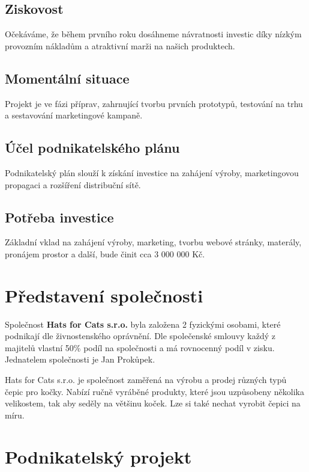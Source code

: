 \documentclass[12pt, a4paper]{article}
\begin{document}
\subsection{Ziskovost}
Očekáváme, že během prvního roku dosáhneme návratnosti investic díky 
nízkým provozním nákladům 
a atraktivní marži na našich produktech.

\subsection{Momentální situace}
Projekt je ve fázi příprav, zahrnující tvorbu prvních prototypů, 
testování na trhu a sestavování marketingové kampaně.

\subsection{Účel podnikatelského plánu}
Podnikatelský plán slouží k získání investice na zahájení výroby, 
marketingovou propagaci a rozšíření distribuční sítě.

\subsection{Potřeba investice}
Základní vklad na zahájení výroby, marketing, tvorbu webové stránky, materály,
pronájem prostor a další, bude činit cca 3 000 000 Kč.

\section{Představení společnosti}
Společnost \textbf{Hats for Cats s.r.o.} byla založena 2 fyzickými osobami,
které podnikají dle živnostenského oprávnění. Dle společenské smlouvy
každý z majitelů vlastní 50\% podíl na společnosti a má rovnocenný podíl v zisku.
Jednatelem společnosti je Jan Prokůpek.

\vspace{10pt}

\noindent Hats for Cats s.r.o. je společnost zaměřená na výrobu a prodej různých typů čepic pro kočky.
Nabízí ručně vyráběné produkty, které jsou uzpůsobeny několika velikostem, tak aby seděly na většinu koček.
Lze si také nechat vyrobit čepici na míru.

\pagebreak

\section{Podnikatelský projekt}
\end{document}
